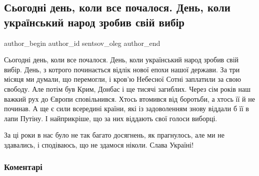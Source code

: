  
 
 
 
 
 
\subsection{Сьогодні день, коли все почалося. День, коли український народ зробив свій вибір}
\label{sec:21_11_2020.fb.sentsov_oleg.1.den_narod_vybir}
\ifcmt
	author_begin
   author_id sentsov_oleg
	author_end
\fi

Сьогодні день, коли все почалося. День, коли український народ зробив свій
вибір. День, з котрого починається відлік нової епохи нашої держави. За три
місяця ми думали, що перемогли, і кров’ю Небесної Сотні заплатили за свою
свободу. Але потім був Крим, Донбас і ще тисячі загиблих. Через сім років наш
важкий рух до Європи сповільнився. Хтось втомився від боротьби, а хтось її й не
починав. А ще є сили всередині країни, які із задоволенням знову віддали б її в
лапи Путіну. І найприкріше, що за них віддають свої голоси виборці. 

За ці роки в нас було не так багато досягнень, як прагнулось, але ми не
здавались, і сподіваюсь, що не здамося ніколи. Слава Україні!

\subsubsection{Коментарі}

